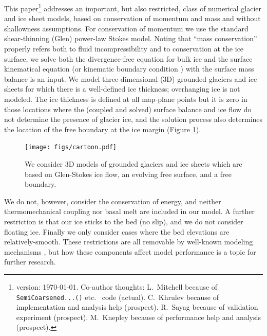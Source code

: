 \documentclass[letterpaper,final,12pt,reqno]{amsart}
\begin{document}
This paper\footnote{version: \today.  Co-author thoughts: L.~Mitchell because of \texttt{SemiCoarsened...()} etc.~ code (actual).  C.~Khrulev because of implementation and analysis help (prospect).  R.~Sayag because of validation experiment (prospect).  M.~Knepley because of performance help and analysis (prospect).} addresses an important, but also restricted, class of numerical glacier and ice sheet models, based on conservation of momentum and mass and without shallowness assumptions.  For conservation of momentum we use the standard shear-thinning (Glen) power-law Stokes model.  Noting that ``mass conservation'' properly refers both to fluid incompressibility and to conservation at the ice surface, we solve both the divergence-free equation for bulk ice and the surface kinematical equation (or kinematic boundary condition \cite{GreveBlatter2009}) with the surface mass balance is an input.  We model three-dimensional (3D) grounded glaciers and ice sheets for which there is a well-defined ice thickness; overhanging ice is not modeled.  The ice thickness is defined at all map-plane points but it is zero in those locations where the (coupled and solved) surface balance and ice flow do not determine the presence of glacier ice, and the solution process also determines the location of the free boundary at the ice margin \cite{SchoofHewitt2013} (Figure \ref{fig:cartoon}).

\begin{figure}[h]
\begin{center}
\texttt{[image: figs/cartoon.pdf]}
\end{center}
\caption{We consider 3D models of grounded glaciers and ice sheets which are based on Glen-Stokes ice flow, an evolving free surface, and a free boundary.}
\label{fig:cartoon}
\end{figure}

We do not, however, consider the conservation of energy, and neither thermomechanical coupling nor basal melt are included in our model.  A further restriction is that our ice sticks to the bed (no slip), and we do not consider floating ice.  Finally we only consider cases where the bed elevations are relatively-smooth.  These restrictions are all removable by well-known modeling mechanisms \cite[for example]{Aschwandenetal2012,Winkelmannetal2011}, but how these components affect model performance is a topic for further research.
\end{document}

